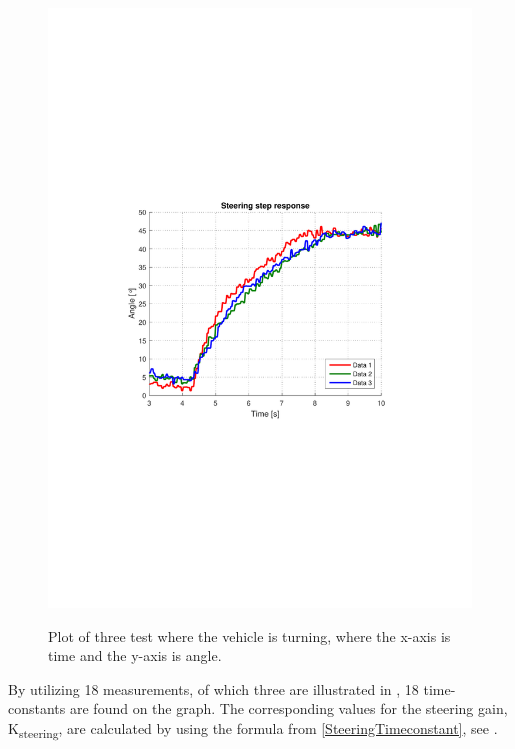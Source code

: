 \begin{figure}[H]
  \centering
  {
    \includegraphics[width=1.2\textwidth]{figures/steeringStep_P2.pdf}
  }
  \caption{Plot of three test where the vehicle is turning, where the x-axis is time and the y-axis is angle.}
  \label{fig:steeringAngleVsTimeKvKp}
\end{figure}
%
By utilizing 18 measurements, of which three are illustrated in , 18 time-constants are found on the graph. The corresponding values for the steering gain, \si{K_{steering}}, are calculated by using the formula from \eqref{SteeringTimeconstant}, see .

